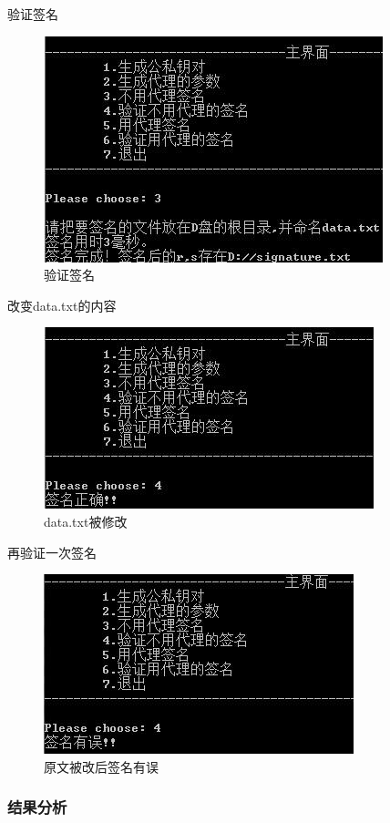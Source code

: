 验证签名

\begin{figure}[H]
\centering
\includegraphics{img/17.jpg}
\caption{验证签名}
\end{figure}

改变data.txt的内容

\begin{figure}[H]
\centering
\includegraphics{img/18.jpg}
\caption{data.txt被修改}
\end{figure}

再验证一次签名

\begin{figure}[H]
\centering
\includegraphics{img/20.jpg}
\caption{原文被改后签名有误}
\end{figure}

\subsubsection{结果分析}

